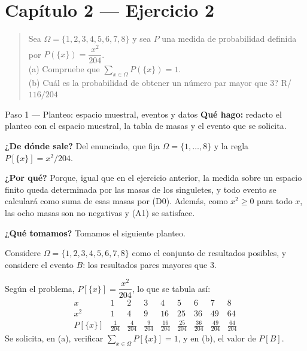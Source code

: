 \documentclass[11pt]{article}
\begin{document}
\section*{Capítulo 2 --- Ejercicio 2}

\begin{quote}
Sea $\Omega=\{1,2,3,4,5,6,7,8\}$ y sea $P$ una medida de probabilidad definida por
$P(\{x\})=\dfrac{x^2}{204}$.\\
(a) Compruebe que $\sum_{x\in\Omega}P(\{x\})=1$.\\
(b) Cuál es la probabilidad de obtener un número par mayor que 3? \hfill R/ $116/204$
\end{quote}

\begin{sol}

\begin{paso}{Paso 1 --- Planteo: espacio muestral, eventos y datos}
\textbf{Qué hago:} redacto el planteo con el espacio muestral, la tabla de masas y el evento
que se solicita.

\textbf{¿De dónde sale?} Del enunciado, que fija $\Omega=\{1,\dots,8\}$ y la regla
$P[\{x\}]=x^{2}/204$.

\textbf{¿Por qué?} Porque, igual que en el ejercicio anterior, la medida sobre un espacio finito
queda determinada por las masas de los singuletes, y todo evento se calculará como suma de esas
masas por (D0). Además, como $x^{2}\ge 0$ para todo $x$, las ocho masas son no negativas y (A1)
se satisface.

\textbf{¿Qué tomamos?} Tomamos el siguiente planteo.

\medskip
Considere $\Omega=\{1,2,3,4,5,6,7,8\}$ como el conjunto de resultados posibles, y considere el
evento $B$: los resultados pares mayores que $3$.

Según el problema, $P[\{x\}]=\dfrac{x^{2}}{204}$, lo que se tabula así:
\[
\begin{array}{c|cccccccc}
x & 1 & 2 & 3 & 4 & 5 & 6 & 7 & 8\\\hline
x^{2} & 1 & 4 & 9 & 16 & 25 & 36 & 49 & 64\\[2pt]
P[\{x\}] & \frac{1}{204} & \frac{4}{204} & \frac{9}{204} & \frac{16}{204} & \frac{25}{204}
& \frac{36}{204} & \frac{49}{204} & \frac{64}{204}
\end{array}
\]
Se solicita, en (a), verificar $\sum_{x\in\Omega}P[\{x\}]=1$, y en (b), el valor de $P[B]$.
\end{paso}


\end{sol}
\end{document}
